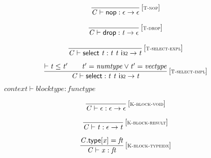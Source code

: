 $$
\begin{array}{@{}c@{}}\displaystyle
\frac{
}{
{\mathit{C}} \vdash \mathsf{nop} : \epsilon \rightarrow \epsilon
} \, {[\textsc{\scriptsize T{-}nop}]}
\qquad
\end{array}
$$

$$
\begin{array}{@{}c@{}}\displaystyle
\frac{
}{
{\mathit{C}} \vdash \mathsf{drop} : {\mathit{t}} \rightarrow \epsilon
} \, {[\textsc{\scriptsize T{-}drop}]}
\qquad
\end{array}
$$

\vspace{1ex}

$$
\begin{array}{@{}c@{}}\displaystyle
\frac{
}{
{\mathit{C}} \vdash \mathsf{select}~{\mathit{t}} : {\mathit{t}}~{\mathit{t}}~\mathsf{i{\scriptstyle32}} \rightarrow {\mathit{t}}
} \, {[\textsc{\scriptsize T{-}select{-}expl}]}
\qquad
\end{array}
$$

$$
\begin{array}{@{}c@{}}\displaystyle
\frac{
{ \vdash }\;{\mathit{t}} \leq {\mathit{t}'}
 \qquad
{\mathit{t}'} = {\mathit{numtype}} \lor {\mathit{t}'} = {\mathit{vectype}}
}{
{\mathit{C}} \vdash \mathsf{select} : {\mathit{t}}~{\mathit{t}}~\mathsf{i{\scriptstyle32}} \rightarrow {\mathit{t}}
} \, {[\textsc{\scriptsize T{-}select{-}impl}]}
\qquad
\end{array}
$$

\vspace{1ex}

$\boxed{{\mathit{context}} \vdash {\mathit{blocktype}} : {\mathit{functype}}}$

$$
\begin{array}{@{}c@{}}\displaystyle
\frac{
}{
{\mathit{C}} \vdash \epsilon : \epsilon \rightarrow \epsilon
} \, {[\textsc{\scriptsize K{-}block{-}void}]}
\qquad
\end{array}
$$

$$
\begin{array}{@{}c@{}}\displaystyle
\frac{
}{
{\mathit{C}} \vdash {\mathit{t}} : \epsilon \rightarrow {\mathit{t}}
} \, {[\textsc{\scriptsize K{-}block{-}result}]}
\qquad
\end{array}
$$

$$
\begin{array}{@{}c@{}}\displaystyle
\frac{
{\mathit{C}}.\mathsf{type}{}[{\mathit{x}}] = {\mathit{ft}}
}{
{\mathit{C}} \vdash {\mathit{x}} : {\mathit{ft}}
} \, {[\textsc{\scriptsize K{-}block{-}typeidx}]}
\qquad
\end{array}
$$

